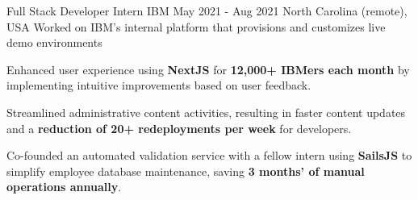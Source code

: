 \begin{cventries}
    \cventry
    {Full Stack Developer Intern} %
    {IBM} %
    {May 2021 - Aug 2021} %
    {North Carolina (remote), USA} %
    {Worked on IBM's internal platform that provisions and customizes live demo environments}
    {
      \begin{cvitems} %
        \item {Enhanced user experience using \textbf{NextJS} for \textbf{12,000+ IBMers each month} by implementing intuitive improvements based on user feedback.}
        \item {Streamlined administrative content activities, resulting in faster content updates and a \textbf{reduction of 20+ redeployments per week} for developers.}
        \item {Co-founded an automated validation service with a fellow intern using \textbf{SailsJS} to simplify employee database maintenance, saving \textbf{3 months' of manual operations annually}.}
      \end{cvitems}
    }



\end{cventries}
